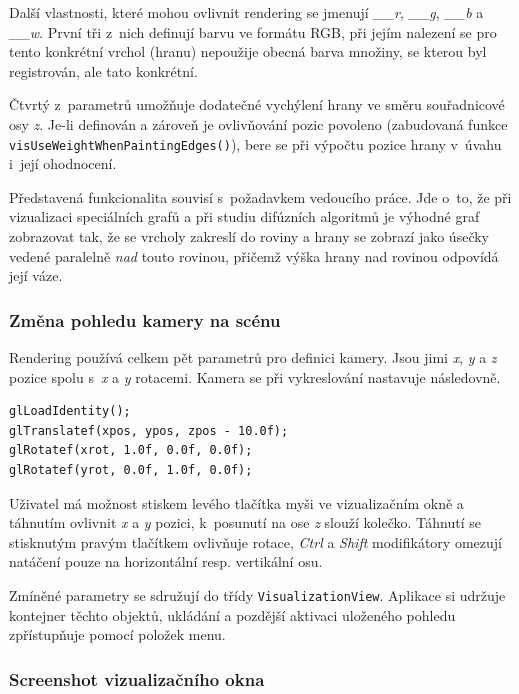 \documentclass[11pt,twoside,a4paper]{book}
\begin{document}
Další vlastnosti, které mohou ovlivnit rendering se jmenují \textit{\_\_r}, \textit{\_\_g}, \textit{\_\_b} a \textit{\_\_w}. První tři z~nich definují barvu ve formátu RGB, při jejím nalezení se pro tento konkrétní vrchol (hranu) nepoužije obecná barva množiny, se kterou byl registrován, ale tato konkrétní.

Čtvrtý z~parametrů umožňuje dodatečné vychýlení hrany ve směru souřadnicové osy \textit{z}. Je-li definován a zároveň je ovlivňování pozic povoleno (zabudovaná funkce \texttt{vis\-Use\-Weight\-When\-Pa\-in\-ting\-Ed\-ges()}), bere se při výpočtu pozice hrany v~úvahu i~její ohodnocení.

Představená funkcionalita souvisí s~požadavkem vedoucího práce. Jde o~to, že při vizualizaci speciálních grafů a při studiu difúzních algoritmů je výhodné graf zobrazovat tak, že se vrcholy zakreslí do roviny a hrany se zobrazí jako úsečky vedené paralelně \textit{nad} touto rovinou, přičemž výška hrany nad rovinou odpovídá její váze.


\subsubsection{Změna pohledu kamery na scénu}

Rendering používá celkem pět parametrů pro definici kamery. Jsou jimi \textit{x}, \textit{y} a \textit{z} pozice spolu s~\textit{x} a \textit{y} rotacemi. Kamera se při vykreslování nastavuje následovně.

\begin{verbatim}
glLoadIdentity();
glTranslatef(xpos, ypos, zpos - 10.0f);
glRotatef(xrot, 1.0f, 0.0f, 0.0f);
glRotatef(yrot, 0.0f, 1.0f, 0.0f);
\end{verbatim}

Uživatel má možnost stiskem levého tlačítka myši ve vizualizačním okně a táhnutím ovlivnit \textit{x} a \textit{y} pozici, k~posunutí na ose \textit{z} slouží kolečko. Táhnutí se stisknutým pravým tlačítkem ovlivňuje rotace, \textit{Ctrl} a \textit{Shift} modifikátory omezují natáčení pouze na horizontální resp. vertikální osu.

Zmíněné parametry se sdružují do třídy \texttt{VisualizationView}. Aplikace si udržuje kontejner těchto objektů, ukládání a pozdější aktivaci uloženého pohledu zpřístupňuje pomocí položek menu.


\subsubsection{Screenshot vizualizačního okna}
\end{document}
